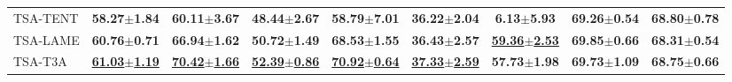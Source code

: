 \begin{table*}[t]
\begin{center}
{\begin{tabular}{lcccccccc}
\midrule
TSA-TENT & \textbf{58.27$\pm$1.84} & \textbf{60.11$\pm$3.67} & \textbf{48.44$\pm$2.67} & \textbf{58.79$\pm$7.01} & \textbf{36.22$\pm$2.04} & \textbf{6.13$\pm$5.93} & \textbf{69.26$\pm$0.54} & \textbf{68.80$\pm$0.78}
\\
TSA-LAME & \textbf{60.76$\pm$0.71} & \textbf{66.94$\pm$1.62} & \textbf{50.72$\pm$1.49} & \textbf{68.53$\pm$1.55} & \textbf{36.43$\pm$2.57} & \underline{\textbf{59.36$\pm$2.53}} & \textbf{69.85$\pm$0.66} & \textbf{68.31$\pm$0.54}
\\
TSA-T3A
& \underline{\textbf{61.03$\pm$1.19}} & \underline{\textbf{70.42$\pm$1.66}} & \underline{\textbf{52.39$\pm$0.86}} & \underline{\textbf{70.92$\pm$0.64}} & \underline{\textbf{37.33$\pm$2.59}} & \textbf{57.73$\pm$1.98} & \textbf{69.73$\pm$1.09} & \textbf{68.75$\pm$0.66}
\\
\bottomrule
\end{tabular}
}
\end{center}
\vspace{-2mm}
\end{table*}


